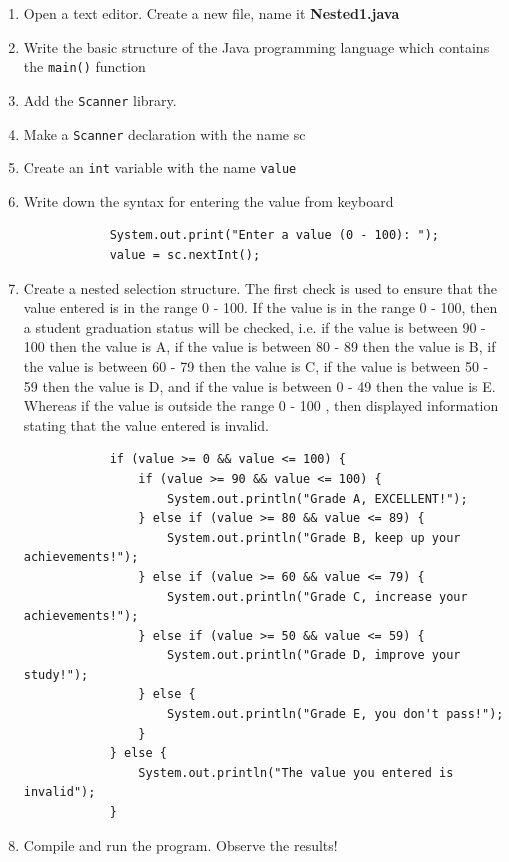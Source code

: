\documentclass[12pt,titlepage]{article}
\begin{document}
\begin{enumerate}
    \item Open a text editor. Create a new file, name it \textbf{Nested1.java}
    \item Write the basic structure of the Java programming language which contains the \texttt{main()} function
    \item Add the \texttt{Scanner} library.
    \item Make a \texttt{Scanner} declaration with the name sc
    \item Create an \texttt{int} variable with the name \texttt{value}
    \item {
        Write down the syntax for entering the value from keyboard

        \begin{verbatim}
            System.out.print("Enter a value (0 - 100): ");
            value = sc.nextInt();
        \end{verbatim}
    }
    \item {
        Create a nested selection structure. The first check is used to ensure that the value
        entered is in the range 0 - 100. If the value is in the range 0 - 100, then a student
        graduation status will be checked, i.e. if the value is between 90 - 100 then the value is
        A, if the value is between 80 - 89 then the value is B, if the value is between 60 - 79 then
        the value is C, if the value is between 50 - 59 then the value is D, and if the value is
        between 0 - 49 then the value is E. Whereas if the value is outside the range 0 - 100 , then
        displayed information stating that the value entered is invalid.

        \begin{verbatim}
            if (value >= 0 && value <= 100) {
                if (value >= 90 && value <= 100) {
                    System.out.println("Grade A, EXCELLENT!");
                } else if (value >= 80 && value <= 89) {
                    System.out.println("Grade B, keep up your achievements!");
                } else if (value >= 60 && value <= 79) {
                    System.out.println("Grade C, increase your achievements!");
                } else if (value >= 50 && value <= 59) {
                    System.out.println("Grade D, improve your study!");
                } else {
                    System.out.println("Grade E, you don't pass!");
                }
            } else {
                System.out.println("The value you entered is invalid");
            }
        \end{verbatim}
    }
    \pagebreak
    \item {
        Compile and run the program. Observe the results!

        
    }
\end{enumerate}
\end{document}
